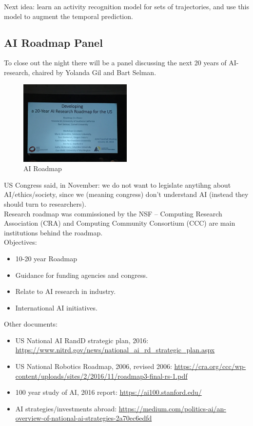 Next idea: learn an activity recognition model for sets of trajectories, and use this model to augment the temporal prediction.

\spacerule
\subsection{AI Roadmap Panel}

To close out the night there will be a panel discussing the next 20 years of AI-research, chaired by Yolanda Gil and Bart Selman. \\

\begin{figure}[h!]
    \centering
    \includegraphics[width=0.5\textwidth]{images/ai_roadmap.JPG}
    \caption{AI Roadmap}
    \label{fig:roadmap}
\end{figure}

US Congress said, in November: we do not want to legislate anytihng about AI/ethics/society, since we (meaning congress) don't understand AI (instead they should turn to researchers). \\

Research roadmap was commissioned by the NSF -- Computing Research Association (CRA) and Computing Community Consortium (CCC) are main institutions behind the roadmap. \\

Objectives:
\begin{itemize}
    \item 10-20 year Roadmap
    \item Guidance for funding agencies and congress.
    \item Relate to AI research in industry.
    \item International AI initiatives.
\end{itemize}

Other documents:
\begin{itemize}
    \item US National AI RandD strategic plan, 2016: \url{https://www.nitrd.gov/news/national_ai_rd_strategic_plan.aspx}
    \item US National Robotics Roadmap, 2006, revised 2006: \url{https://cra.org/ccc/wp-content/uploads/sites/2/2016/11/roadmap3-final-rs-1.pdf}
    \item 100 year study of AI, 2016 report: \url{https://ai100.stanford.edu/}
    \item AI strategies/investments abroad: \url{https://medium.com/politics-ai/an-overview-of-national-ai-strategies-2a70ec6edfd}
\end{itemize}

